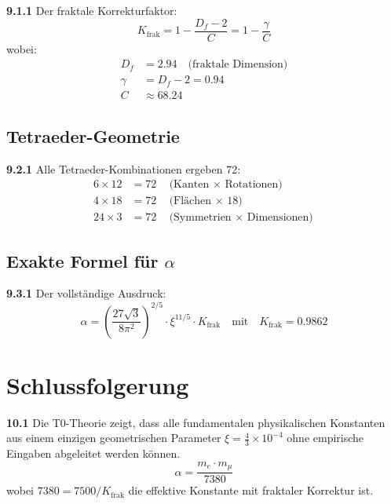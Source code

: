 \documentclass[12pt,a4paper]{article}
\newcommand{\xipar}{\xi}
\begin{document}
\noindent \textbf{9.1.1} Der fraktale Korrekturfaktor:
\begin{equation}
	\boxed{K_{\text{frak}} = 1 - \frac{D_f - 2}{C} = 1 - \frac{\gamma}{C}}
\end{equation}
wobei:
\begin{align}
	D_f &= 2.94 \quad \text{(fraktale Dimension)} \\
	\gamma &= D_f - 2 = 0.94 \\
	C &\approx 68.24
\end{align}

\subsection{Tetraeder-Geometrie}

\begin{tcolorbox}[colback=yellow!5!white,colframe=red!75!black,title=Erstaunliche Entdeckung]
	\noindent \textbf{9.2.1} Alle Tetraeder-Kombinationen ergeben 72:
	\begin{align}
		6 \times 12 &= 72 \quad \text{(Kanten $\times$ Rotationen)} \\
		4 \times 18 &= 72 \quad \text{(Flächen $\times$ 18)} \\
		24 \times 3 &= 72 \quad \text{(Symmetrien $\times$ Dimensionen)}
	\end{align}
\end{tcolorbox}

\subsection{Exakte Formel für $\alpha$}

\noindent \textbf{9.3.1} Der vollständige Ausdruck:
\begin{equation}
	\boxed{\alpha = \left( \frac{27 \sqrt{3}}{8 \pi^2} \right)^{2/5} \cdot \xipar^{11/5} \cdot K_{\text{frak}}}
	\quad \text{mit} \quad K_{\text{frak}} = 0.9862
\end{equation}

\section{Schlussfolgerung}

\begin{tcolorbox}[colback=green!5,colframe=green!75!black,title=Zentrales Ergebnis]
	\noindent \textbf{10.1} Die T0-Theorie zeigt, dass alle fundamentalen physikalischen Konstanten aus einem einzigen geometrischen Parameter $\xipar = \frac{4}{3} \times 10^{-4}$ ohne empirische Eingaben abgeleitet werden können.
	\begin{equation}
		\boxed{\alpha = \frac{m_e \cdot m_\mu}{7380}}
	\end{equation}
	wobei $7380 = 7500 / K_{\text{frak}}$ die effektive Konstante mit fraktaler Korrektur ist.
\end{tcolorbox}
\end{document}
